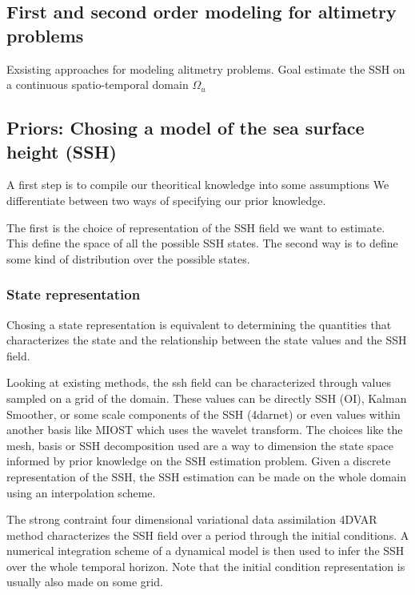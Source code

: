 \begin{bibunit}

  \chapter*{First and second order modeling for altimetry problems}
 
 Exsisting approaches for modeling alitmetry problems.
 Goal estimate the SSH on a continuous spatio-temporal domain $\Omega_u$
 
 
  \section{Priors: Chosing a model of the sea surface height (SSH)}
A first step is to compile our theoritical knowledge into some assumptions 
We differentiate between two ways of specifying our prior knowledge.

The first is the choice of representation of the SSH field we want to estimate. This define the space of all the possible SSH states.
The second way is to define some kind of distribution over the possible states.


 
  \subsection{State representation}
Chosing a state representation is equivalent to determining the quantities that characterizes the state and the relationship between the state values and the SSH field.


  Looking at existing methods, the ssh field can be characterized through values sampled on a grid of the domain. These values can be directly SSH (OI), Kalman Smoother, or some scale components of the SSH (4darnet) or even values within another basis like MIOST which uses the wavelet transform.
  The choices like the mesh, basis or SSH decomposition used are a way to dimension the state space informed by  prior knowledge on the SSH estimation problem.
Given a discrete representation of the SSH, the SSH estimation can be made on the whole domain using an interpolation scheme.

The strong contraint four dimensional variational data assimilation 4DVAR method characterizes the SSH field over a period through the initial conditions. A numerical integration scheme of a dynamical model is then used to infer the SSH over the whole temporal horizon. Note that the initial condition representation is usually also made on some grid. 


\end{bibunit}
